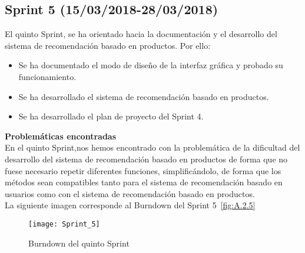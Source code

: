 \subsection{\textbf{Sprint 5} (15/03/2018-28/03/2018) }
El quinto  Sprint, se ha orientado hacia la documentación y el desarrollo del sistema de recomendación basado en productos. 
Por ello: 
\begin{itemize}
\item Se ha documentado el modo de diseño de la interfaz gráfica y probado su funcionamiento.   
\item Se ha desarrollado el sistema de recomendación basado en productos.  
\item Se ha desarrollado el plan de proyecto del Sprint 4.
 
\end{itemize}
\textbf{Problemáticas encontradas}\\En el quinto Sprint,nos hemos encontrado con la problemática de la dificultad del desarrollo del sistema de recomendación basado en productos de forma que no fuese necesario repetir diferentes funciones, simplificándolo, de forma que los métodos sean compatibles tanto  para el sistema de recomendación basado en usuarios como con el sistema de recomendación basado en productos. 
 \\La siguiente imagen corresponde al Burndown del Sprint 5~\ref{fig:A.2.5}
\begin{figure}[h]
\centering
\texttt{[image: Sprint\_5]}
\caption{Burndown del quinto Sprint}
\label{fig:A.2.4}
\end{figure}
\\
